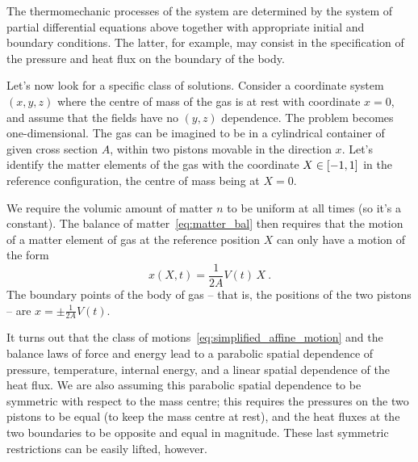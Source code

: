 \documentclass[\ifafour a4paper,12pt,\else a5paper,10pt,\fi%
onecolumn,oneside,article,%
british%
]{memoir}
\theoremstyle{remark}
\theoremstyle{innote}
\DeclarePairedDelimiter\clcl{[}{]}
\renewcommand*{\|}[1][]{\nonscript\,#1\vert\nonscript\;\mathopen{}}
\newcommand*{\yVb}{V}
\begin{document}
The thermomechanic processes of the system are determined by the system of
partial differential equations above together with appropriate initial and
boundary conditions. The latter, for example, may consist in the
specification of the pressure and heat flux on the boundary of the body.

\bigskip

Let's now look for a specific class of solutions. Consider a coordinate
system $(x,y,z)$ where the centre of mass of the gas is at rest with
coordinate $x=0$, and assume that the fields have no $(y,z)$ dependence.
The problem becomes one-dimensional. The gas can be imagined to be in a
cylindrical container of given cross section $A$, within two pistons
movable in the direction $x$. Let's identify the matter elements of the gas
with the coordinate $X \in \clcl{-1, 1}$ in the reference configuration,
the centre of mass being at $X=0$.

We require the volumic amount of matter $n$ to be uniform at all times (so
it's a constant). The balance of matter~\eqref{eq:matter_bal} then requires
that the motion of a matter element of gas at the reference position $X$
can only have a motion of the form
\begin{equation}
  \label{eq:simplified_affine_motion}
  x(X,t) = \frac{1}{2A}\yVb(t) \, X \ .
\end{equation}
The boundary points of the body of gas -- that is, the positions of the two
pistons -- are $x=\pm\frac{1}{2A}\yVb(t)$.


It turns out that the class of motions~\eqref{eq:simplified_affine_motion}
and the balance laws of force and energy lead to a parabolic spatial
dependence of pressure, temperature, internal energy, and a linear spatial
dependence of the heat flux. We are also assuming this parabolic spatial
dependence to be symmetric with respect to the mass centre; this requires
the pressures on the two pistons to be equal (to keep the mass centre at
rest), and the heat fluxes at the two boundaries to be opposite and equal
in magnitude. These last symmetric restrictions can be easily lifted,
however.
\end{document}

